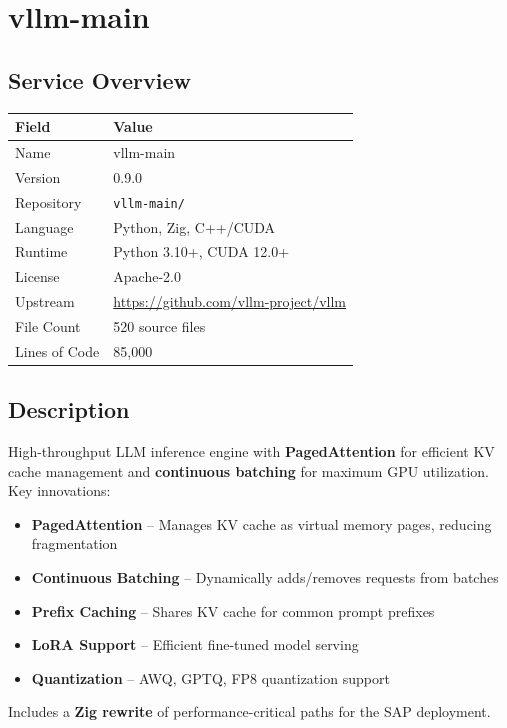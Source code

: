\documentclass[11pt,a4paper]{article}
\begin{document}
\section{vllm-main}

\subsection{Service Overview}

\begin{tabular}{@{}L{4cm}L{10cm}@{}}
\toprule
\textbf{Field} & \textbf{Value} \\
\midrule
Name & vllm-main \\
Version & 0.9.0 \\
Repository & \texttt{vllm-main/} \\
Language & Python, Zig, C++/CUDA \\
Runtime & Python 3.10+, CUDA 12.0+ \\
License & Apache-2.0 \\
Upstream & \url{https://github.com/vllm-project/vllm} \\
File Count & 520 source files \\
Lines of Code & 85,000 \\
\bottomrule
\end{tabular}

\subsection{Description}

High-throughput LLM inference engine with \textbf{PagedAttention} for efficient KV cache management and \textbf{continuous batching} for maximum GPU utilization. Key innovations:

\begin{itemize}[noitemsep]
    \item \textbf{PagedAttention} -- Manages KV cache as virtual memory pages, reducing fragmentation
    \item \textbf{Continuous Batching} -- Dynamically adds/removes requests from batches
    \item \textbf{Prefix Caching} -- Shares KV cache for common prompt prefixes
    \item \textbf{LoRA Support} -- Efficient fine-tuned model serving
    \item \textbf{Quantization} -- AWQ, GPTQ, FP8 quantization support
\end{itemize}

Includes a \textbf{Zig rewrite} of performance-critical paths for the SAP deployment.
\end{document}
